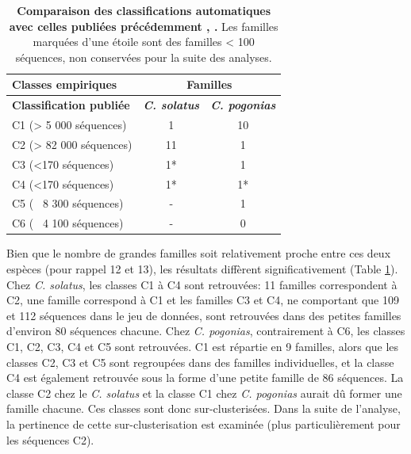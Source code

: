 \documentclass[12pt,a4paper]{article}
\begin{document}
		\begin{table}
		\caption{\textbf{Comparaison des classifications automatiques avec celles publiées précédemment \cite{Cacheux2016}, \cite{Cacheux2018}.} Les familles marquées d'une étoile sont des familles < 100 séquences, non conservées pour la suite des analyses.}
			\center
			\begin{tabular}{|l|c|c|}
			\hline
			\textbf{Classes empiriques} & \multicolumn{2}{c|}{\textbf{Familles}} \\
	    	\hline
			\textbf{Classification publiée} &  \textbf{\textit{C. solatus}}  & \textbf{\textit{C. pogonias}}\\
			\hline
			C1 (> 5 000 séquences) &  1  & 10\\
			\hline
			C2 (> 82 000 séquences) & 11  & 1 \\
			\hline
			C3 (<170 séquences) & 1* & 1 \\
			\hline
			C4 (<170 séquences) & 1* & 1* \\
			\hline
			C5 (~ 8 300 séquences)& - 	 &  1 \\
			\hline
			C6 (~ 4 100 séquences) & -   &  0 \\
			\hline
			\end{tabular}
		\label{tab_count_fam}
	\end{table}
		
	Bien que le nombre de grandes familles soit relativement proche entre ces deux espèces (pour rappel 12 et 13), les résultats diffèrent significativement (Table \ref{tab_count_fam}). Chez \textit{C. solatus}, les classes C1 à C4 sont retrouvées: 11 familles correspondent à C2, une famille correspond à C1 et les familles C3 et C4, ne comportant que 109 et 112 séquences dans le jeu de données, sont retrouvées dans des petites familles d'environ 80 séquences chacune. Chez \textit{C. pogonias}, contrairement à C6, les classes C1, C2, C3, C4 et C5 sont retrouvées. C1 est répartie en 9 familles, alors que les classes C2, C3 et C5 sont regroupées dans des familles individuelles, et la classe C4 est également retrouvée sous la forme d'une petite famille de 86 séquences. La classe C2 chez le \textit{C. solatus} et la classe C1 chez \textit{C. pogonias} aurait dû former une famille chacune. Ces classes sont donc sur-clusterisées. Dans la suite de l'analyse, la pertinence de cette sur-clusterisation est examinée (plus particulièrement pour les séquences C2).
	
\end{document}
